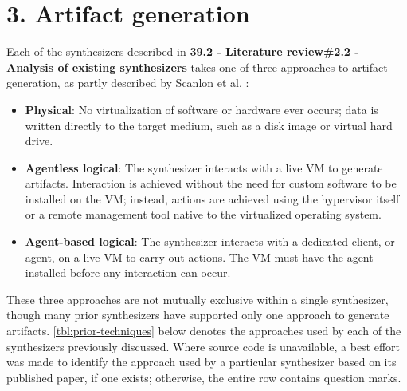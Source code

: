 \section{3. Artifact generation}\label{artifact-generation}

Each of the synthesizers described in \textbf{39.2 - Literature
review\#2.2 - Analysis of existing synthesizers} takes one of three
approaches to artifact generation, as partly described by Scanlon et al.
\cite{scanlonEviPlantEfficientDigital2017}:

\begin{itemize}
\item
  \textbf{Physical}: No virtualization of software or hardware ever
  occurs; data is written directly to the target medium, such as a disk
  image or virtual hard drive.
\item
  \textbf{Agentless logical}: The synthesizer interacts with a live VM
  to generate artifacts. Interaction is achieved without the need for
  custom software to be installed on the VM; instead, actions are
  achieved using the hypervisor itself or a remote management tool
  native to the virtualized operating system.
\item
  \textbf{Agent-based logical}: The synthesizer interacts with a
  dedicated client, or agent, on a live VM to carry out actions. The VM
  must have the agent installed before any interaction can occur.
\end{itemize}

These three approaches are not mutually exclusive within a single
synthesizer, though many prior synthesizers have supported only one
approach to generate artifacts. \autoref{tbl:prior-techniques} below
denotes the approaches used by each of the synthesizers previously
discussed. Where source code is unavailable, a best effort was made to
identify the approach used by a particular synthesizer based on its
published paper, if one exists; otherwise, the entire row contains
question marks.


